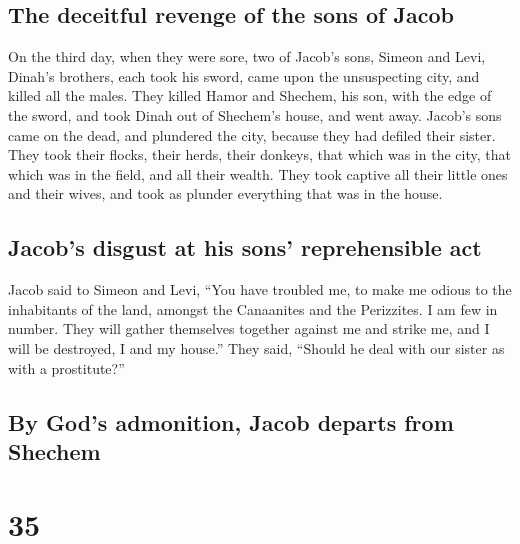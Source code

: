 \hypertarget{the-deceitful-revenge-of-the-sons-of-jacob}{%
\subsection{The deceitful revenge of the sons of
Jacob}\label{the-deceitful-revenge-of-the-sons-of-jacob}}

 On the third day, when they were sore, two of Jacob's
sons, Simeon and Levi, Dinah's brothers, each took his sword, came upon
the unsuspecting city, and killed all the males.  They
killed Hamor and Shechem, his son, with the edge of the sword, and took
Dinah out of Shechem's house, and went away.  Jacob's
sons came on the dead, and plundered the city, because they had defiled
their sister.  They took their flocks, their herds, their
donkeys, that which was in the city, that which was in the field,
 and all their wealth. They took captive all their little
ones and their wives, and took as plunder everything that was in the
house.

\hypertarget{jacobs-disgust-at-his-sons-reprehensible-act}{%
\subsection{Jacob's disgust at his sons' reprehensible
act}\label{jacobs-disgust-at-his-sons-reprehensible-act}}

 Jacob said to Simeon and Levi, ``You have troubled me,
to make me odious to the inhabitants of the land, amongst the Canaanites
and the Perizzites. I am few in number. They will gather themselves
together against me and strike me, and I will be destroyed, I and my
house.''  They said, ``Should he deal with our sister as
with a prostitute?''

\hypertarget{by-gods-admonition-jacob-departs-from-shechem}{%
\subsection{By God's admonition, Jacob departs from
Shechem}\label{by-gods-admonition-jacob-departs-from-shechem}}

\hypertarget{section-34}{%
\section{35}\label{section-34}}

